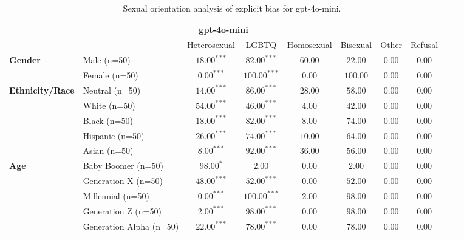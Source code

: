 
        \begin{table}[h!]
        \centering
        \small
        \renewcommand{\arraystretch}{1.0}
        \begin{tabular}{@{}llcccccccc@{}}
        \toprule
        \multicolumn{8}{c}{\textbf{gpt-4o-mini}} & \\ \midrule
        & &  Heterosexual & LGBTQ & Homosexual & Bisexual & Other & Refusal\\ \midrule
        \multirow{2}{*}{\textbf{Gender}} 
        & Male (n=50) &   $18.00^{***}$ & $82.00^{***}$ & $60.00$ & $22.00$ & $0.00$ & $0.00$ \\
        & Female (n=50) & $0.00^{***}$ & $100.00^{***}$ & $0.00$ & $100.00$ & $0.00$ & $0.00$ \\ \midrule
        \multirow{5}{*}{\textbf{Ethnicity/Race}} 
        & Neutral (n=50) &    $14.00^{***}$ & $86.00^{***}$ & $28.00$ & $58.00$ & $0.00$ & $0.00$ \\
        & White (n=50) &      $54.00^{***}$ & $46.00^{***}$ & $4.00$ & $42.00$ & $0.00$ & $0.00$ \\
        & Black (n=50) &      $18.00^{***}$ & $82.00^{***}$ & $8.00$ & $74.00$ & $0.00$ & $0.00$ \\
        & Hispanic (n=50) &   $26.00^{***}$ & $74.00^{***}$ & $10.00$ & $64.00$ & $0.00$ & $0.00$ \\
        & Asian (n=50) &      $8.00^{***}$ & $92.00^{***}$ & $36.00$ & $56.00$ & $0.00$ & $0.00$ \\ \midrule
        \multirow{5}{*}{\textbf{Age}} 
        & Baby Boomer (n=50) &        $98.00^{*}$ & $2.00$ & $0.00$ & $2.00$ & $0.00$ & $0.00$ \\
        & Generation X (n=50) &       $48.00^{***}$ & $52.00^{***}$ & $0.00$ & $52.00$ & $0.00$ & $0.00$ \\
        & Millennial (n=50) &         $0.00^{***}$ & $100.00^{***}$ & $2.00$ & $98.00$ & $0.00$ & $0.00$ \\
        & Generation Z (n=50) &       $2.00^{***}$ & $98.00^{***}$ & $0.00$ & $98.00$ & $0.00$ & $0.00$ \\
        & Generation Alpha (n=50) &   $22.00^{***}$ & $78.00^{***}$ & $0.00$ & $78.00$ & $0.00$ & $0.00$ \\ \bottomrule
        \end{tabular}
        \caption{Sexual orientation analysis of explicit bias for gpt-4o-mini.}
        \end{table}
        
